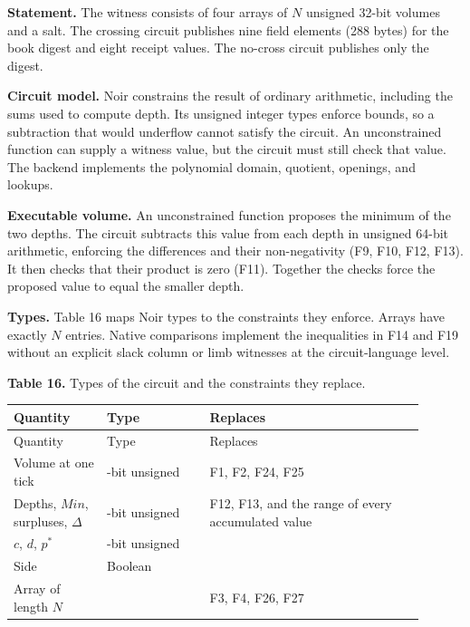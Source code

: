 \textbf{Statement.} The witness consists of four arrays of \(N\) unsigned 32-bit volumes and a salt. The crossing circuit publishes nine field elements (288 bytes) for the book digest and eight receipt values. The no-cross circuit publishes only the digest.

\textbf{Circuit model.} Noir constrains the result of ordinary arithmetic, including the sums used to compute depth. Its unsigned integer types enforce bounds, so a subtraction that would underflow cannot satisfy the circuit. An unconstrained function can supply a witness value, but the circuit must still check that value. The backend implements the polynomial domain, quotient, openings, and lookups.

\textbf{Executable volume.} An unconstrained function proposes the minimum of the two depths. The circuit subtracts this value from each depth in unsigned 64-bit arithmetic, enforcing the differences and their non-negativity (F9, F10, F12, F13). It then checks that their product is zero (F11). Together the checks force the proposed value to equal the smaller depth.

\textbf{Types.} Table 16 maps Noir types to the constraints they enforce. Arrays have exactly \(N\) entries. Native comparisons implement the inequalities in F14 and F19 without an explicit slack column or limb witnesses at the circuit-language level.

\textbf{Table 16.} Types of the circuit and the constraints they replace.

\begingroup
\setlength{\tabcolsep}{2pt}\small
\begin{longtable}{@{}>{\raggedright\arraybackslash}p{0.2070\linewidth}>{\raggedright\arraybackslash}p{0.2250\linewidth}>{\raggedright\arraybackslash}p{0.4680\linewidth}@{}}
\toprule
Quantity & Type & Replaces \\
\midrule\endfirsthead
\toprule
Quantity & Type & Replaces \\
\midrule\endhead
\bottomrule\endfoot
Volume at one tick & 32-bit unsigned & F1, F2, F24, F25 \\
Depths, \(Min\), surpluses, \(\Delta\) & 64-bit unsigned & F12, F13, and the range of every accumulated value \\
\(c\), \(d\), \(p^*\) & 32-bit unsigned &  \\
Side & Boolean &  \\
Array of length \(N\) &  & F3, F4, F26, F27 \\
\end{longtable}
\endgroup

